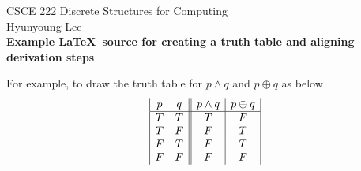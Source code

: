 \documentclass[12pt]{article}
\begin{document}
\vspace*{-15mm}
\begin{center}
CSCE 222 Discrete Structures for Computing\\[.5ex]
Hyunyoung Lee\\[1ex]
\textbf{Example \LaTeX\ source for creating a truth table and aligning derivation steps}\\[1ex]
\end{center}

\noindent
For example, to draw the truth table for $p \land q$ and $p \oplus q$ as below
\begin{displaymath}
\begin{array}{|c c||c|c|} 
% 
%
p & q & p \land q & p \oplus q\\ %
\hline  %
T & T & T & F\\
T & F & F & T\\
F & T & F & T\\
F & F & F & F\\
\end{array}
\end{displaymath}
\end{document}
